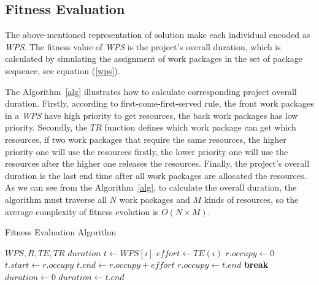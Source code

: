   \vspace{-2mm}
\subsection{Fitness Evaluation}
 \vspace{-2mm}
The above-mentioned representation of solution make each individual encoded as
\emph{WPS}. The fitness value of \emph{WPS} is the project's overall duration,
which is calculated by simulating the assignment of work packages in the set of
package sequence, see equation (\ref{wps}).

The Algorithm~\ref{alg} illustrates  how to calculate corresponding project overall
duration. Firstly, according to first-come-first-served
rule, the front work packages in a \emph{WPS} have high priority to get
resources, the back work packages has low priority. Secondly, the $TR$ function
defines which work package can get which resources, if two work packages that
require the same resources, the higher priority one will use the resources
firstly, the lower priority one will use the resources after the higher one
releases the resources. Finally, the project's overall duration is the last end
time after all work packages are allocated the resources.
As we can see from the Algorithm~\ref{alg}, to calculate the overall duration,
the algorithm must traverse all $N$ work packages and $M$ kinds of resources,
so the average complexity of fitness evolution is $O(N \times M)$.

\begin{algorithm}[!h]
  \caption{Fitness Evaluation Algorithm}
  \label{alg}
  \begin{algorithmic}
    \REQUIRE $WPS, R, TE, TR$
    \ENSURE $duration$
      \STATE $t \gets WPS[i]$
      \STATE $ effort \gets TE(i)$
        \STATE $r.occupy \gets 0$
      \ENDFOR 
          \STATE $t.start \gets r.occupy$
          \STATE $t.end \gets r.occupy + effort$
          \STATE $r.occupy \gets t.end$
          \STATE \textbf{break}
        \ENDIF
      \ENDFOR
    \ENDFOR
    \STATE $duration \gets 0$  
        \STATE $duration \gets t.end$
      \ENDIF
    \ENDFOR
  \end{algorithmic}
\end{algorithm}
  \vspace{-2mm}
